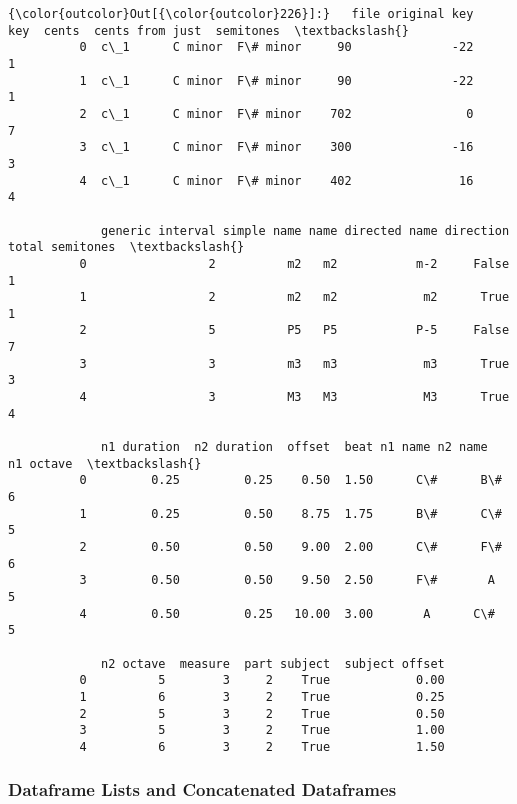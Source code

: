 \begin{Verbatim}[commandchars=\\\{\}]
{\color{outcolor}Out[{\color{outcolor}226}]:}   file original key       key  cents  cents from just  semitones  \textbackslash{}
          0  c\_1      C minor  F\# minor     90              -22          1   
          1  c\_1      C minor  F\# minor     90              -22          1   
          2  c\_1      C minor  F\# minor    702                0          7   
          3  c\_1      C minor  F\# minor    300              -16          3   
          4  c\_1      C minor  F\# minor    402               16          4   
          
             generic interval simple name name directed name direction  total semitones  \textbackslash{}
          0                 2          m2   m2           m-2     False                1   
          1                 2          m2   m2            m2      True                1   
          2                 5          P5   P5           P-5     False                7   
          3                 3          m3   m3            m3      True                3   
          4                 3          M3   M3            M3      True                4   
          
             n1 duration  n2 duration  offset  beat n1 name n2 name  n1 octave  \textbackslash{}
          0         0.25         0.25    0.50  1.50      C\#      B\#          6   
          1         0.25         0.50    8.75  1.75      B\#      C\#          5   
          2         0.50         0.50    9.00  2.00      C\#      F\#          6   
          3         0.50         0.50    9.50  2.50      F\#       A          5   
          4         0.50         0.25   10.00  3.00       A      C\#          5   
          
             n2 octave  measure  part subject  subject offset  
          0          5        3     2    True            0.00  
          1          6        3     2    True            0.25  
          2          5        3     2    True            0.50  
          3          5        3     2    True            1.00  
          4          6        3     2    True            1.50  
\end{Verbatim}
    \subsubsection{Dataframe Lists and Concatenated
Dataframes}\label{dataframe-lists-and-concatenated-dataframes}

